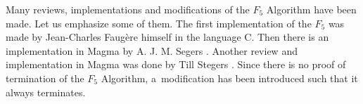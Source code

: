 Many reviews, implementations and modifications of the $F_5$ Algorithm have been made. Let us emphasize some of them. The first implementation of the $F_5$ was made by Jean-Charles Faug\`ere himself in the language C. Then there is an implementation in Magma by A. J. M. Segers \cite{Segers}. Another review and implementation in Magma was done by Till Stegers \cite{Stegers}. Since there is no proof of termination of the $F_5$ Algorithm, a~modification \cite{ModifyingF5} has been introduced such that it always terminates. 
